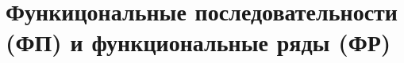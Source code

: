 \documentclass[../main.tex]{subfiles}
\begin{document}
 \chapter{Функицональные последовательности (ФП) и функциональные ряды (ФР)}
 
\end{document}
